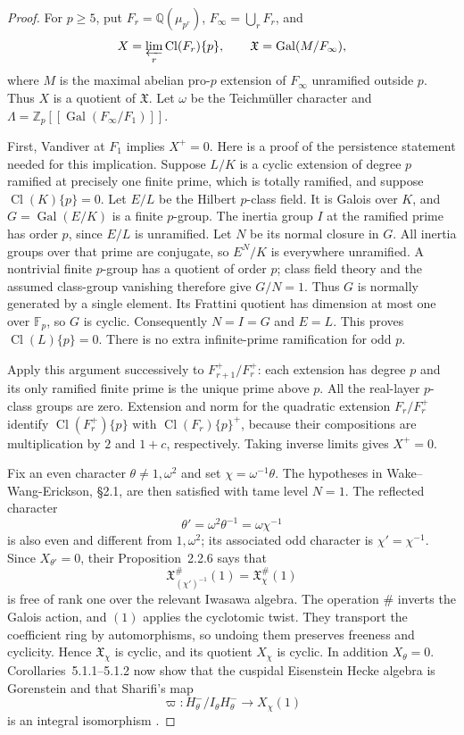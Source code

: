 \documentclass[11pt,a4paper]{article}
\theoremstyle{definition}
\begin{document}
\begin{proof}
For $p\ge5$, put $F_r=\mathbb Q(\mu_{p^r})$,
$F_\infty=\bigcup_rF_r$, and
\[
 X=\varprojlim_r\operatorname{Cl}(F_r)\{p\},\qquad
 \mathfrak X=\operatorname{Gal}(M/F_\infty),
\]
where $M$ is the maximal abelian pro-$p$ extension of $F_\infty$
unramified outside $p$. Thus $X$ is a quotient of $\mathfrak X$.
Let $\omega$ be the Teichm\"uller character and
$\Lambda=\mathbb Z_p[[\operatorname{Gal}(F_\infty/F_1)]]$.

First, Vandiver at $F_1$ implies $X^+=0$. Here is a proof of the
persistence statement needed for this implication. Suppose $L/K$ is a
cyclic extension of degree $p$ ramified at precisely one finite prime,
which is totally ramified, and suppose $\operatorname{Cl}(K)\{p\}=0$.
Let $E/L$ be the Hilbert $p$-class field. It is Galois over $K$, and
$G=\operatorname{Gal}(E/K)$ is a finite $p$-group. The inertia group $I$
at the ramified prime has order $p$, since $E/L$ is unramified. Let $N$
be its normal closure in $G$. All inertia groups over that prime are
conjugate, so $E^N/K$ is everywhere unramified. A nontrivial finite
$p$-group has a quotient of order $p$; class field theory and the assumed
class-group vanishing therefore give $G/N=1$. Thus $G$ is normally
generated by a single element. Its Frattini quotient has dimension at
most one over $\mathbb F_p$, so $G$ is cyclic. Consequently $N=I=G$
and $E=L$. This proves $\operatorname{Cl}(L)\{p\}=0$.
There is no extra infinite-prime ramification for odd $p$.

Apply this argument successively to $F_{r+1}^+/F_r^+$: each extension
has degree $p$ and its only ramified finite prime is the unique prime
above $p$. All the real-layer $p$-class groups are zero. Extension and
norm for the quadratic extension $F_r/F_r^+$ identify
$\operatorname{Cl}(F_r^+)\{p\}$ with
$\operatorname{Cl}(F_r)\{p\}^+$, because their compositions are
multiplication by $2$ and $1+c$, respectively. Taking inverse limits
gives $X^+=0$.

Fix an even character $\theta\ne1,\omega^2$ and set
$\chi=\omega^{-1}\theta$. The hypotheses in
Wake--Wang-Erickson, \S2.1, are then satisfied with tame level $N=1$.
The reflected character
\[
 \theta'=\omega^2\theta^{-1}=\omega\chi^{-1}
\]
is also even and different from $1,\omega^2$; its associated odd
character is $\chi'=\chi^{-1}$. Since $X_{\theta'}=0$, their
Proposition~2.2.6 says that
\[
 \mathfrak X_{(\chi')^{-1}}^{\#}(1)
   =\mathfrak X_\chi^{\#}(1)
\]
is free of rank one over the relevant Iwasawa algebra. The operation
$\#$ inverts the Galois action, and $(1)$ applies the cyclotomic twist.
They transport the coefficient ring by automorphisms, so undoing them
preserves freeness and cyclicity. Hence $\mathfrak X_\chi$ is cyclic,
and its quotient $X_\chi$ is cyclic. In addition $X_\theta=0$.
Corollaries~5.1.1--5.1.2 now show that the cuspidal Eisenstein Hecke
algebra is Gorenstein and that Sharifi's map
\[
 \varpi:H^-_\theta/I_\theta H^-_\theta
       \longrightarrow X_\chi(1)
\]
is an integral isomorphism
\cite[\S2.1, Proposition~2.2.6, Corollaries~5.1.1--5.1.2;
preprint pp.~2--4 and~11]{WakeWangErickson2017}.


\end{proof}
\end{document}

